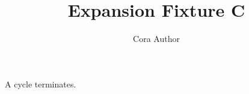 \title{Expansion Fixture C}\author{Cora Author}
\begin{proposition}\label{main}A cycle terminates.\end{proposition}
\cite{a}

